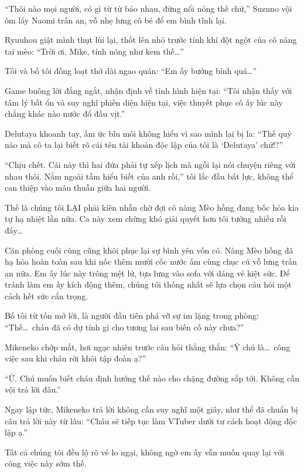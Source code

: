 ﻿\documentclass[../main.tex]{subfiles}
\begin{document}
``Thôi nào mọi người, có gì từ từ bảo nhau, đừng nổi nóng thế chứ,'' Suzuno vội ôm lấy Naomi trấn an, vỗ nhẹ lưng cô bé để em bình tĩnh lại.

Ryuuhou giật mình thụt lùi lại, thốt lên nhỏ trước tính khí đột ngột của cô nàng tai mèo: ``Trời ơi, Mike, tính nóng như kem thế\dots''

Tôi và bố tôi đồng loạt thở dài ngao quán: ``Em ấy bướng bỉnh quá\dots''

Game buông lời đắng ngắt, nhận định về tình hình hiện tại: ``Tôi nhận thấy với tâm lý bất ổn và suy nghĩ phiến diện hiện tại, việc thuyết phục cô ấy lúc này chẳng khác nào nước đổ đầu vịt.''

Delutaya khoanh tay, ấm ức bĩu môi không hiểu vì sao mình lại bị la: ``Thế quỷ nào mà cô ta lại biết rõ cái tên tài khoản độc lập của tôi là `Delutaya' chứ!?''

``Chịu chết. Cái này thì hai đứa phải tự xếp lịch mà ngồi lại nói chuyện riêng với nhau thôi. Nằm ngoài tầm hiểu biết của anh rồi,'' tôi lắc đầu bất lực, không thể can thiệp vào mâu thuẫn giữa hai người.

Thế là chúng tôi LẠI phải kiên nhẫn chờ đợi cô nàng Mèo hồng đang bốc hỏa kia tự hạ nhiệt lần nữa. Ca này xem chừng khó giải quyết hơn tôi tưởng nhiều rồi đấy\dots

\ct

Căn phòng cuối cùng cũng khôi phục lại sự bình yên vốn có. Nàng Mèo hồng đã hạ hỏa hoàn toàn sau khi nốc thêm mười cốc nước ấm cùng chục cú vỗ lưng trấn an nữa. Em ấy lúc này trông mệt lử, tựa lưng vào sofa với dáng vẻ kiệt sức. Để tránh làm em ấy kích động thêm, chúng tôi thống nhất sẽ lựa chọn câu hỏi một cách hết sức cẩn trọng.

Bố tôi từ tốn mở lời, là người đầu tiên phá vỡ sự im lặng trong phòng: ``Thế\dots\ cháu đã có dự tính gì cho tương lai sau biến cố này chưa?''

Mikeneko chớp mắt, hơi ngạc nhiên trước câu hỏi thẳng thắn: ``Ý chú là\dots\ công việc sau khi cháu rời khỏi tập đoàn ạ?''

``Ừ. Chú muốn biết cháu định hướng thế nào cho chặng đường sắp tới. Không cần vội trả lời đâu.''

Ngay lập tức, Mikeneko trả lời không cần suy nghĩ một giây, như thể đã chuẩn bị câu trả lời này từ lâu: ``Cháu sẽ tiếp tục làm VTuber dưới tư cách hoạt động độc lập ạ.''

Tất cả chúng tôi đều lộ rõ vẻ lo ngại, không ngờ em ấy vẫn muốn quay lại với công việc này sớm thế.
\end{document}
